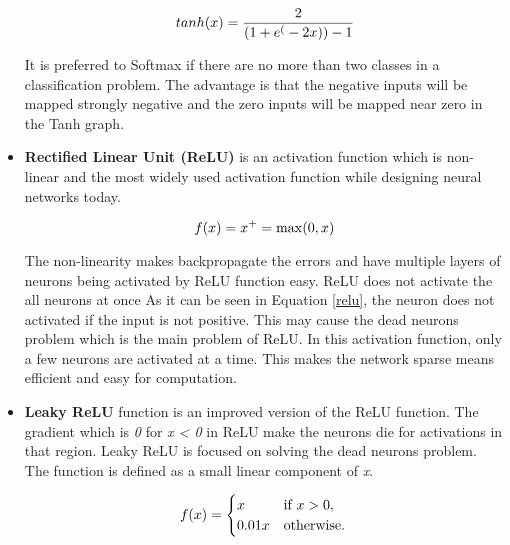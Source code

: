 \begin{itemize}
                    \begin{equation}
                        tanh(x) = \frac{2}{(1+e^(-2x)) -1} \label{tanh} \\
                    \end{equation}

                    It is preferred to Softmax if there are no more than two classes in a classification problem.
                    The advantage is that the negative inputs will be mapped strongly negative and the zero inputs will be mapped near zero in the Tanh graph.

            \item \textbf{Rectified Linear Unit (ReLU)} is an activation function which is non-linear and the most widely used activation function while designing neural networks today.

                    \begin{equation}
                          f(x) = x^+ = \max(0, x) \label{relu} \\
                    \end{equation}

                    The non-linearity makes backpropagate the errors and have multiple layers of neurons being activated by ReLU function easy.
                    ReLU does not activate the all neurons at once
                    As it can be seen in Equation \eqref{relu}, the neuron does not activated if the input is not positive.
                    This may cause the dead neurons problem which is the main problem of ReLU.
                    In this activation function, only a few neurons are activated at a time. This makes the network sparse means efficient and easy for computation.

            \item \textbf{Leaky ReLU} function is an improved version of the ReLU function.
                    The gradient which is \emph{0} for \emph{x < 0} in ReLU make the neurons die for activations in that region.
                    Leaky ReLU is focused on solving the dead neurons problem.
                    The function is defined as a small linear component of \emph{x}.

                    \begin{equation}
                         f(x) = \begin{cases} x &
                            \text{if } x > 0, \\
                            0.01x & \text{otherwise}.
                         \end{cases}\\
                    \end{equation}


\end{itemize}
